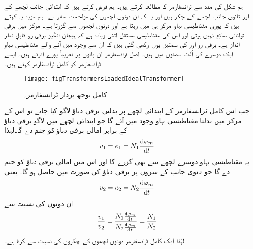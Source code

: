 ہم شکل   کی مدد سے ٹرانسفارمر کا مطالعہ کرتے ہیں۔  ہم فرض کرتے ہیں کہ ابتدائی جانب لچھے کے  اور ثانوی جانب لچھے کے  چکر ہیں اور یہ کہ ان  دونوں لچھوں کی مزاحمت صفر ہے۔ ہم مزید یہ کہتے ہیں کہ پوری مقناطیسی بہاو  مرکز ہی میں رہتا ہے اور دونوں لچھوں سے گزرتا ہے۔ مرکز میں برقی توانائی ضائع نہیں ہوتی اور اس کی مقناطیسی مستقل اتنی زیادہ ہے کہ ہیجان انگیز برقی رو قابلِ نظر انداز ہے۔ برقی رو   اور  کی سمتیں یوں رکھی گئی ہیں کہ ان سے وجود میں آنے والے مقناطیسی بہاو ایک دوسرے کی اُلٹ سمتوں میں  ہیں۔ اصل ٹرانسفارمر ان باتوں پر تقریباً پورے اترتے ہیں۔ ایسے ٹرانسفارمر کو کامل ٹرانسفارمر  کہتے ہیں۔
\begin{figure}
\centering
\texttt{[image: figTransformersLoadedIdealTransformer]}
\caption{کامل بوجھ بردار ٹرانسفارمر۔}
\label{شکل_ٹرانسفارمر_کامل_بار_بردار_ٹرانسفارمر}
\end{figure}

جب اس کامل ٹرانسفارمر کے ابتدائی لچھے پر بدلتی برقی دباؤ  لاگو کیا جائے تو اس کے مرکز میں بدلتا مقناطیسی بہاو   وجود میں  آئے گا جو ابتدائی لچھے میں   لاگو برقی دباؤ  کے برابر امالی برقی دباؤ  کو جنم دے گا۔لہٰذا
\begin{align}
v_1=e_1=N_1 \frac{\dif \varphi_m}{\dif t}
\end{align}
یہ مقناطیسی بہاو دوسرے لچھے سے بھی گزرے گا اور اس میں  امالی برقی دباؤ کو جنم دے گا جو ثانوی جانب کے سروں پر برقی دباؤ   کی صورت میں حاصل ہو گا۔ یعنی
\begin{align}
v_2=e_2=N_2 \frac{\dif \varphi_m}{\dif t}
\end{align}
ان دونوں کی نسبت سے
\begin{align}\label{مساوات_ٹرانسفارمر_تبادلہ_دباؤ}
\frac{v_1}{v_2}=\frac{N_1 \frac{\dif \varphi_m}{\dif t}}{N_2 \frac{\dif \varphi_m}{\dif t}}=\frac{N_1}{N_2}
\end{align}
لہٰذا ایک کامل ٹرانسفارمر دونوں لچھوں کے چکروں کی نسبت سے  کرتا ہے۔


